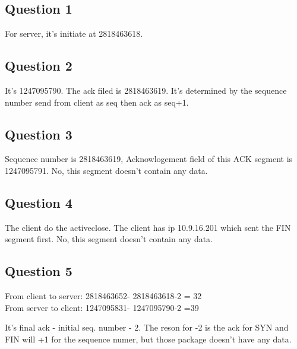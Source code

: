\documentclass{article}
\begin{document}
\subsection{Question 1}

For server, it's initiate at 2818463618.

\subsection{Question 2}

It's 1247095790. The ack filed is 2818463619. 
It's determined by the sequence number send from client as seq then ack as seq+1.

\subsection{Question 3}

Sequence number is 2818463619, Acknowlogement field of this ACK segment is 1247095791.
No, this segment doesn't contain any data.

\subsection{Question 4}

The client do the activeclose. The client has ip 10.9.16.201 which sent the FIN segment first.
No, this segment doesn't contain any data.

\subsection{Question 5}

From client to server:
2818463652-
2818463618-2 = 32
\\
From server to client: 
1247095831-
1247095790-2 =39

It's final ack - initial seq. number - 2. The reson for -2 is the ack for SYN and FIN will 
+1 for the sequence numer, but those package doesn't have any data.
\end{document}
